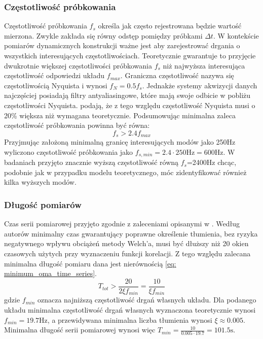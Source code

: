 \subsubsection{Częstotliwość próbkowania}
Częstotliwość próbkowania $f_s$ określa jak często rejestrowana będzie wartość mierzona. Zwykle zakłada się równy odstęp pomiędzy próbkami $\Delta t$. W kontekście pomiarów dynamicznych konstrukcji ważne jest aby zarejestrować drgania o wszystkich interesujących częstotliwościach. Teoretycznie gwarantuje to przyjęcie dwukrotnie większej częstotliwości próbkowania $f_s$ niż najwyższa interesująca częstotliwość odpowiedzi układu $f_{max}$. Graniczna częstotliwość nazywa się częstotliwością Nyquista i wynosi $f_N = 0.5f_s$. Jednakże systemy akwizycji danych najczęściej posiadają filtry antyaliasingowe, które mają swoje odbicie w pobliżu częstotliwości Nyquista. \cite{Brincker2015} podają, że z tego względu częstotliwość Nyquista musi o 20\% większa niż wymagana teoretycznie. Podsumowując minimalna zaleca częstotliwość próbkowania powinna być równa:
\begin{equation} \label{eq: oma_min_sampling}
	f_s > 2.4 f_{max}
\end{equation}
Przyjmując założoną minimalną granicę interesujących modów jako 250Hz wyliczono częstotliwość próbkowania jako $f_{s,min}=2.4\cdot250\text{Hz}=600\text{Hz}.$ W badaniach przyjęto znacznie wyższą częstotliwość równą $f_s$=2400Hz chcąc, podobnie jak w przypadku modelu teoretycznego, móc zidentyfikować również kilka wyższych modów.
\subsubsection{Długość pomiarów}
Czas serii pomiarowej przyjęto zgodnie z zaleceniami opisanymi w \cite{Brincker2015}. Według autorów minimalny czas gwarantujący poprawne określenie tłumienia, bez ryzyka negatywnego wpływu obciążeń metody Welch'a, musi być dłuższy niż 20 okien czasowych użytych przy wyznaczeniu funkcji korelacji. Z tego względu zalecana minimalna długość pomiaru dana jest nierównością \ref{eq: minimum_oma_time_series}.
\begin{equation} \label{eq: oma_min_time_series}
	T_{tot} > \frac{20}{2\xi f_{min}}=\frac{10}{\xi f_{min}}
\end{equation}
gdzie $f_{min}$ oznacza najniższą częstotliwość drgań własnych układu. Dla podanego układu minimalna częstotliwość drgań własnych wyznaczona teoretycznie wynosi $f_{min}=19.7 \text{Hz}$, a przewidywana minimalna liczba tłumienia wynosi $\xi \approx 0.005$. Minimalna długość serii pomiarowej wynosi więc $T_{min} = \frac{10}{0.005\cdot 19.7} = 101.5 \text{s}$. 

